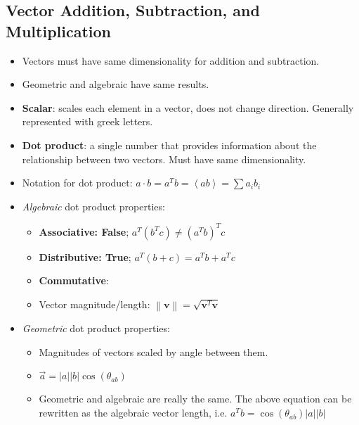 \documentclass[12pt,a4paper]{article}
\begin{document}
\subsection{Vector Addition, Subtraction, and Multiplication}
\begin{itemize}
    \item Vectors must have same dimensionality for addition and subtraction.
    \item Geometric and algebraic have same results.
    \item \textbf{Scalar}: scales each element in a vector, does not change direction. Generally represented with greek letters.
    \item \textbf{Dot product}: a single number that provides information about the relationship between two vectors. Must have same dimensionality.
    \item Notation for dot product: \(a\cdot b = a^Tb = \left\langle ab\right\rangle = \sum a_i b_i\)
    \item \textit{Algebraic} dot product properties:
        \begin{itemize}
            \item \textbf{Associative: {\color{r-Lush}False}}; \(a^T(b^Tc) \neq (a^Tb)^Tc\)
            \item \textbf{Distributive: {\color{G-Leaf}True}}; \(a^T(b+c) = a^Tb + a^Tc\)
            \item \textbf{Commutative}: 
            \item Vector magnitude/length: \(\left\lVert \bm{v}\right\rVert = \sqrt{\bm{v}^T\bm{v}}\)
        \end{itemize}
    \item \textit{Geometric} dot product properties:
        \begin{itemize}
            \item Magnitudes of vectors scaled by angle between them.
            \item \(\vec{a} = |a||b|\cos(\theta_{ab})\)
            \item Geometric and algebraic are really the same. The above equation can be rewritten as the algebraic vector length, i.e.  \(a^Tb = \cos(\theta_{ab})|a||b|\)
        \end{itemize}
\end{itemize}
\end{document}
